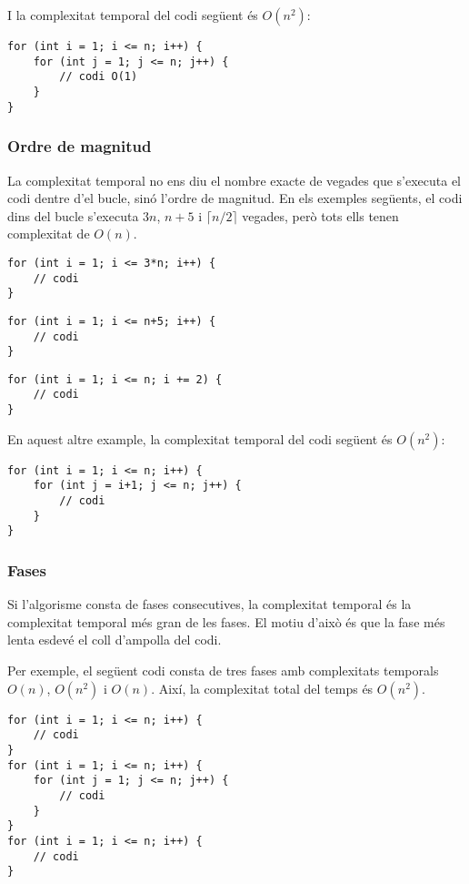I la complexitat temporal del codi següent és $O(n^2)$:
\begin{lstlisting}
for (int i = 1; i <= n; i++) {
    for (int j = 1; j <= n; j++) {
        // codi O(1)
    }
}
\end{lstlisting}

\subsubsection*{Ordre de magnitud}

La complexitat temporal no ens diu el nombre exacte de vegades
que s'executa el codi dentre d'el bucle,
sinó l'ordre de magnitud.
En els exemples següents, el codi dins del bucle
s'executa $3n$, $n+5$ i $\lceil n/2 \rceil$ vegades,
però tots ells tenen complexitat de $O(n)$.

\begin{lstlisting}
for (int i = 1; i <= 3*n; i++) {
    // codi
}
\end{lstlisting}

\begin{lstlisting}
for (int i = 1; i <= n+5; i++) {
    // codi
}
\end{lstlisting}

\begin{lstlisting}
for (int i = 1; i <= n; i += 2) {
    // codi
}
\end{lstlisting}

En aquest altre example,
la complexitat temporal del codi següent és $O(n^2)$:

\begin{lstlisting}
for (int i = 1; i <= n; i++) {
    for (int j = i+1; j <= n; j++) {
        // codi
    }
}
\end{lstlisting}

\subsubsection*{Fases}

Si l'algorisme consta de fases consecutives,
la complexitat temporal és la complexitat temporal més
gran de les fases.
El motiu d'això és que la fase més lenta esdevé el
coll d'ampolla del codi.

Per exemple, el següent codi consta
de tres fases amb complexitats temporals
$O(n)$, $O(n^2)$ i $O(n)$.
Així, la complexitat total del temps és $O(n^2)$.

\begin{lstlisting}
for (int i = 1; i <= n; i++) {
    // codi
}
for (int i = 1; i <= n; i++) {
    for (int j = 1; j <= n; j++) {
        // codi
    }
}
for (int i = 1; i <= n; i++) {
    // codi
}
\end{lstlisting}


